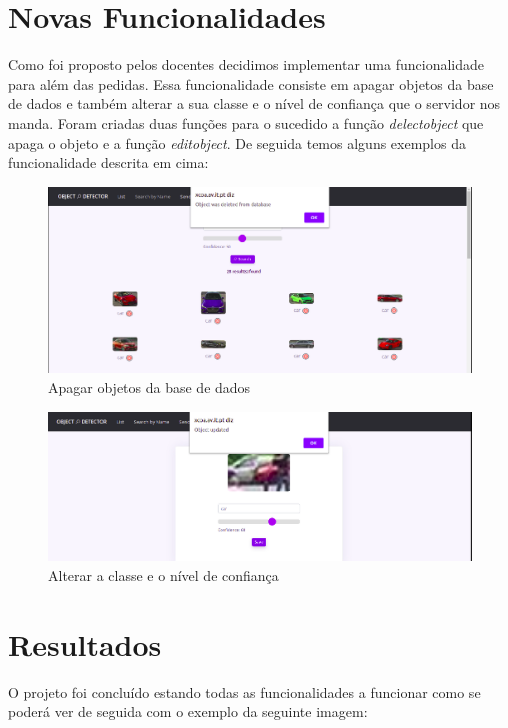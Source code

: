 \documentclass{report}
\begin{document}
\chapter{Novas Funcionalidades}
\label{chap.novafunc}
Como foi proposto pelos docentes decidimos implementar uma funcionalidade para além das pedidas. Essa funcionalidade consiste em apagar objetos da base de dados e também alterar a sua classe e o nível de confiança que o servidor nos manda.
Foram criadas duas funções para o sucedido a função \textit{delect\textunderscore object} que apaga o objeto e a função \textit{edit\textunderscore object}.
De seguida temos alguns exemplos da funcionalidade descrita em cima:
\vspace{10mm}
\begin{figure}[!ht]
    \centering
    \includegraphics[scale = 0.3]{newfunc.png}
    \caption{Apagar objetos da base de dados}
    \label{fig:newfunc1}
\end{figure}
\vspace{15mm}
\begin{figure}[!ht]
    \centering
    \includegraphics[scale = 0.3]{newfunc2.png}
    \caption{Alterar a classe e o nível de confiança}
    \label{fig:newfunc2}
\end{figure}

\chapter{Resultados}
\label{chap.resultados}
O projeto foi concluído estando todas as funcionalidades a funcionar como se poderá ver de seguida com o exemplo da seguinte imagem:\\
\end{document}
